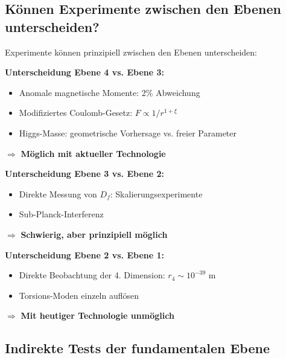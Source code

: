 	\subsection{Können Experimente zwischen den Ebenen unterscheiden?}
	
	\begin{important}
		Experimente können prinzipiell zwischen den Ebenen unterscheiden:
		
		\vspace{0.3cm}
		
		\textbf{Unterscheidung Ebene 4 vs. Ebene 3:}
		\begin{itemize}
			\item Anomale magnetische Momente: 2\% Abweichung
			\item Modifiziertes Coulomb-Gesetz: $F \propto 1/r^{1+\xi}$
			\item Higgs-Masse: geometrische Vorhersage vs. freier Parameter
		\end{itemize}
		
		$\Rightarrow$ \textbf{Möglich mit aktueller Technologie}
		
		\vspace{0.3cm}
		
		\textbf{Unterscheidung Ebene 3 vs. Ebene 2:}
		\begin{itemize}
			\item Direkte Messung von $D_f$: Skalierungsexperimente
			\item Sub-Planck-Interferenz
		\end{itemize}
		
		$\Rightarrow$ \textbf{Schwierig, aber prinzipiell möglich}
		
		\vspace{0.3cm}
		
		\textbf{Unterscheidung Ebene 2 vs. Ebene 1:}
		\begin{itemize}
			\item Direkte Beobachtung der 4. Dimension: $r_4 \sim 10^{-39}$ m
			\item Torsions-Moden einzeln auflösen
		\end{itemize}
		
		$\Rightarrow$ \textbf{Mit heutiger Technologie unmöglich}
	\end{important}
	
	\subsection{Indirekte Tests der fundamentalen Ebene}
	
